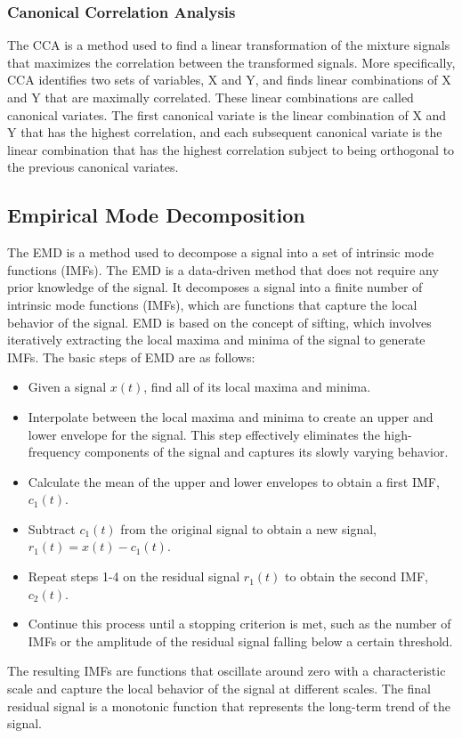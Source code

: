 \documentclass[a4paper]{sapthesis}
\begin{document}
\subsubsection{Canonical Correlation Analysis}
The CCA\cite{cca} is a method used to find a linear transformation of the
mixture signals that maximizes the correlation between the transformed signals.
More specifically, CCA identifies two sets of variables, X and Y, and 
finds linear combinations of X and Y that are maximally correlated. 
These linear combinations are called canonical variates.
 The first canonical variate is the linear combination of X and Y that 
 has the highest correlation, and each subsequent canonical variate is 
 the linear combination that has the highest correlation subject to being
  orthogonal to the previous canonical variates.
\newline

\subsection{Empirical Mode Decomposition}\label{sec:emd}
The EMD\cite{emd} is a method used to decompose a signal into a set of
intrinsic mode functions (IMFs). The EMD is a data-driven method that
does not require any prior knowledge of the signal. \newline
It decomposes a signal into a finite number of intrinsic mode functions
 (IMFs), which are functions that capture the local behavior of the signal.
  EMD is based on the concept of sifting, which involves iteratively
 extracting the local maxima and minima of the signal to generate IMFs.
The basic steps of EMD are as follows:
\begin{itemize}
    \item Given a signal $x(t)$, find all of its local maxima and minima.
    \item Interpolate between the local maxima and minima to create an
    upper and lower envelope for the signal. This step effectively
     eliminates the high-frequency components of the signal and 
     captures its slowly varying behavior.
    \item Calculate the mean of the upper and lower envelopes to obtain a
     first IMF, $c_1(t)$.
    \item Subtract $c_1(t)$ from the original signal to obtain a new signal,
        $r_1(t) = x(t) - c_1(t)$.
    \item Repeat steps 1-4 on the residual signal $r_1(t)$ to obtain the
        second IMF, $c_2(t)$.
    \item Continue this process until a stopping criterion is met, such as
        the number of IMFs or the amplitude of the residual signal falling
        below a certain threshold.
\end{itemize}
The resulting IMFs are functions that oscillate around zero with a 
characteristic scale and capture the local behavior of the signal at 
different scales. The final residual signal is a monotonic function that 
represents the long-term trend of the signal.
\end{document}
